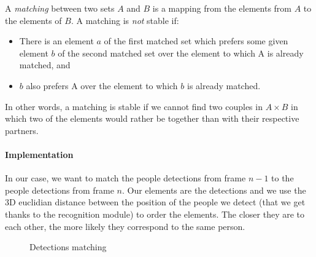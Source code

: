 \documentclass[a4paper, twocolumn]{article}
\newcommand{\changeSize}[1]{\fontsize{#1pt}{7.2}\selectfont}
\newcommand{\tinySize}{\changeSize{8}}
\begin{document}
    A \textit{matching} between two sets $A$ and $B$ is a mapping from the elements from $A$ to the elements of $B$. A matching is \emph{not} stable if:
    \begin{itemize}
        \item There is an element $a$ of the first matched set which prefers some given element $b$ of the second matched set over the element to which A is already matched, and
        \item $b$ also prefers A over the element to which $b$ is already matched.
    \end{itemize}

    In other words, a matching is stable if we cannot find two couples in $A \times B$ in which two of the elements would rather be together than with their respective partners.

    \paragraph{Implementation} In our case, we want to match the people detections from frame $n-1$ to the people detections from frame $n$. Our elements are the detections and we use the 3D euclidian distance between the position of the people we detect (that we get thanks to the recognition module) to order the elements. The closer they are to each other, the more likely they correspond to the same person.

    \begin{figure}
        \centering
        \caption{Detections matching}
        \label{pred_match}
    \end{figure}
\end{document}
